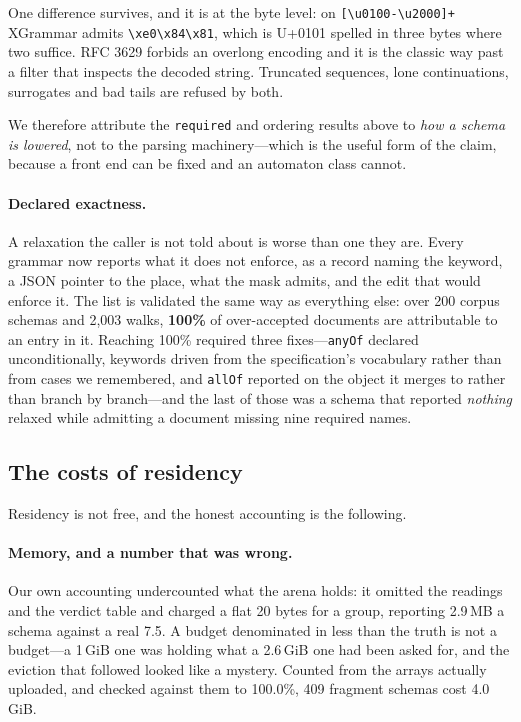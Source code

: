 \documentclass{article}
\begin{document}
One difference survives, and it is at the byte level: on
\verb|[\u0100-\u2000]+| XGrammar admits \verb|\xe0\x84\x81|, which is U+0101
spelled in three bytes where two suffice. RFC 3629 forbids an overlong encoding
and it is the classic way past a filter that inspects the decoded string.
Truncated sequences, lone continuations, surrogates and bad tails are refused
by both.

We therefore attribute the \texttt{required} and ordering results above to
\emph{how a schema is lowered}, not to the parsing machinery---which is the
useful form of the claim, because a front end can be fixed and an automaton
class cannot.

\paragraph{Declared exactness.} A relaxation the caller is not told about is
worse than one they are. Every grammar now reports what it does not enforce, as
a record naming the keyword, a JSON pointer to the place, what the mask admits,
and the edit that would enforce it. The list is validated the same way as
everything else: over 200 corpus schemas and 2{,}003 walks, \textbf{100\%} of
over-accepted documents are attributable to an entry in it. Reaching 100\%
required three fixes---\texttt{anyOf} declared unconditionally, keywords driven
from the specification's vocabulary rather than from cases we remembered, and
\texttt{allOf} reported on the object it merges to rather than branch by
branch---and the last of those was a schema that reported \emph{nothing}
relaxed while admitting a document missing nine required names.

\subsection{The costs of residency}
\label{sec:costs}

Residency is not free, and the honest accounting is the following.

\paragraph{Memory, and a number that was wrong.} Our own accounting undercounted
what the arena holds: it omitted the readings and the verdict table and charged
a flat 20 bytes for a group, reporting 2.9\,MB a schema against a real 7.5. A
budget denominated in less than the truth is not a budget---a 1\,GiB one was
holding what a 2.6\,GiB one had been asked for, and the eviction that followed
looked like a mystery. Counted from the arrays actually uploaded, and checked
against them to 100.0\%, 409 fragment schemas cost 4.0\,GiB.
\end{document}
